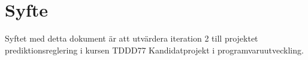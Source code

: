 \section{Syfte}
Syftet med detta dokument är att utvärdera iteration 2 till projektet prediktionsreglering i kursen TDDD77 Kandidatprojekt i programvaruutveckling. 